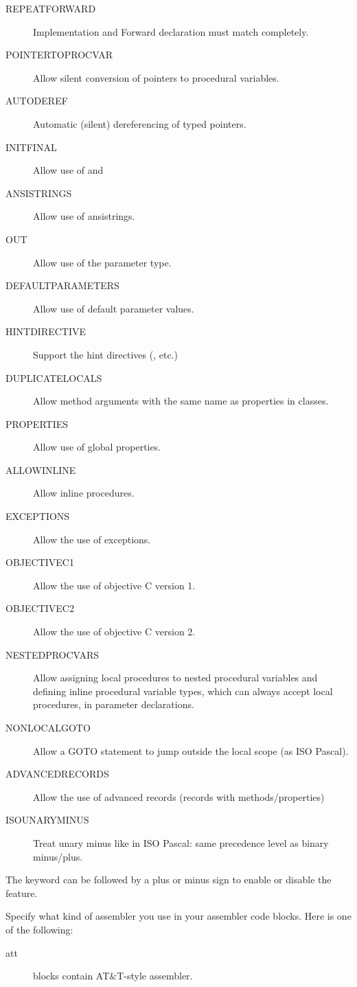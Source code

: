 \begin{description}
\begin{description}
\item[REPEATFORWARD] Implementation and Forward declaration must match completely.
\item[POINTERTOPROCVAR] Allow silent conversion of pointers to procedural
variables.
\item[AUTODEREF] Automatic (silent) dereferencing of typed pointers.
\item[INITFINAL] Allow use of  and 
\item[ANSISTRINGS] Allow use of ansistrings.
\item[OUT] Allow use of the  parameter type.
\item[DEFAULTPARAMETERS] Allow use of default parameter values.
\item[HINTDIRECTIVE] Support the hint directives (,  etc.)
\item[DUPLICATELOCALS] Allow method arguments with the same name as properties in classes.
\item[PROPERTIES] Allow use of global properties.
\item[ALLOWINLINE] Allow inline procedures.
\item[EXCEPTIONS] Allow the use of exceptions.
\item[OBJECTIVEC1] Allow the use of objective C version 1.
\item[OBJECTIVEC2] Allow the use of objective C version 2.
\item[NESTEDPROCVARS] Allow assigning local procedures to nested procedural variables and defining inline procedural variable types, which can always accept local procedures, in parameter declarations.
\item[NONLOCALGOTO] Allow a GOTO statement to jump outside the local scope (as ISO Pascal).
\item[ADVANCEDRECORDS] Allow the use of advanced records (records with methods/properties)
\item[ISOUNARYMINUS] Treat unary minus like in ISO Pascal: same precedence level as binary minus/plus.
\end{description}
The keyword can be followed by a plus or minus sign to enable or disable the
feature.
\item [-Rxxx]  Specify what kind of assembler you use in
your  assembler code blocks. Here  is one of the following:
\begin{description}
\item [att\ ]  blocks contain AT\&T-style  assembler.

\end{description}
\end{description}
